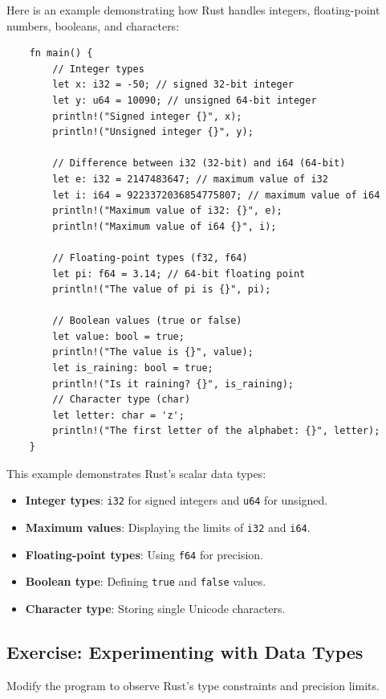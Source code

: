 \documentclass[a4paper,12pt]{report}
\begin{document}
	\noindent Here is an example demonstrating how Rust handles integers, floating-point numbers, booleans, and characters:

\begin{lstlisting}
	fn main() {
		// Integer types
		let x: i32 = -50; // signed 32-bit integer
		let y: u64 = 10090; // unsigned 64-bit integer
		println!("Signed integer {}", x);
		println!("Unsigned integer {}", y);
		
		// Difference between i32 (32-bit) and i64 (64-bit)
		let e: i32 = 2147483647; // maximum value of i32
		let i: i64 = 9223372036854775807; // maximum value of i64
		println!("Maximum value of i32: {}", e);
		println!("Maximum value of i64 {}", i);
		
		// Floating-point types (f32, f64)
		let pi: f64 = 3.14; // 64-bit floating point
		println!("The value of pi is {}", pi);
		
		// Boolean values (true or false)
		let value: bool = true;
		println!("The value is {}", value);
		let is_raining: bool = true;
		println!("Is it raining? {}", is_raining);
		// Character type (char)
		let letter: char = 'z';
		println!("The first letter of the alphabet: {}", letter);
	}
\end{lstlisting}


\begin{explanationbox}
	This example demonstrates Rust's scalar data types:
	
	\begin{itemize}
		\item \textbf{Integer types}: \texttt{i32} for signed integers and \texttt{u64} for unsigned.
		\item \textbf{Maximum values}: Displaying the limits of \texttt{i32} and \texttt{i64}.
		\item \textbf{Floating-point types}: Using \texttt{f64} for precision.
		\item \textbf{Boolean type}: Defining \texttt{true} and \texttt{false} values.
		\item \textbf{Character type}: Storing single Unicode characters.
	\end{itemize}
\end{explanationbox}



\subsection*{Exercise: Experimenting with Data Types}
Modify the program to observe Rust’s type constraints and precision limits.
\end{document}
